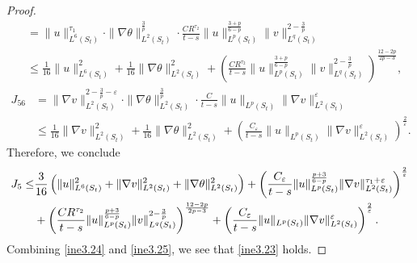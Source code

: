 \documentclass[11pt,reqno]{amsart}
\numberwithin{Thm}{section}
\begin{document}
\begin{proof}
\begin{align*}
&=\|u\|_{L^6(S_t)}^{\tau_1}\cdot\|\nabla\theta\|_{L^2(S_t)}^{\frac{3}{p}}\cdot\frac{CR^{\tau_2}}{t-s}\|u\|_{L^p(S_t)}^\frac{3+p}{6-p}\|v\|_{L^q(S_t)}^{2-\frac{3}{p}}\\
&\leq\frac{1}{16}\|u\|_{L^6(S_t)}^2+\frac{1}{16}\|\nabla\theta\|_{L^2(S_t)}^2+\left(\frac{C R^{\tau_2}}{t-s}\|u\|_{L^p(S_t)}^\frac{3+p}{6-p}\|v\|_{L^q(S_t)}^{2-\frac{3}{p}}\right)^\frac{12-2p}{2p-3},
\end{align*}
\begin{align*}
J_{56}&=\|\nabla v\|_{L^2(S_t)}^{2-\frac{3}{p}-\varepsilon}\cdot\|\nabla\theta\|_{L^2(S_t)}^{\frac{3}{p}}\cdot\frac{C}{t-s}\|u\|_{L^p(S_t)}\|\nabla v\|_{L^2(S_t)}^{\varepsilon}\\
&\leq\frac{1}{16}\|\nabla v\|_{L^2(S_t)}^2+\frac{1}{16}\|\nabla\theta\|_{L^2(S_t)}^2+\left(\frac{C_\varepsilon}{t-s}\|u\|_{L^p(S_t)}\|\nabla v\|_{L^2(S_t)}^{\varepsilon}\right)^\frac{2}{\varepsilon}.
\end{align*}
Therefore, we conclude
\begin{align}
	J_5\leq&\frac{3}{16}\left(\|u\|_{L^6(S_t)}^2+\|\nabla v\|_{L^2(S_t)}^2+\|\nabla \theta\|_{L^2(S_t)}^2\right)+\left(\frac{C_\varepsilon}{t-s}\|u\|_{L^p(S_t)}^\frac{p+3}{6-p}\|\nabla v\|_{L^2(S_t)}^{\tau_1+\varepsilon}\right)^\frac{2}{\varepsilon}\notag\\
	&+\left(\frac{CR^{\tau_2}}{t-s}\|u\|_{L^p(S_t)}^\frac{p+3}{6-p}\|v\|_{L^q(S_t)}^{2-\frac{3}{p}}\right)^\frac{12-2p}{2p-3}+\left(\frac{C_\varepsilon}{t-s}\| u\|_{L^p(S_t)}\| \nabla v\|_{L^2(S_t)}^{\varepsilon}\right)^\frac{2}{\varepsilon}.\label{ine3.25}
\end{align}
Combining \eqref{ine3.24} and \eqref{ine3.25}, we see that \eqref{ine3.23} holds.
\end{proof}
\end{document}
